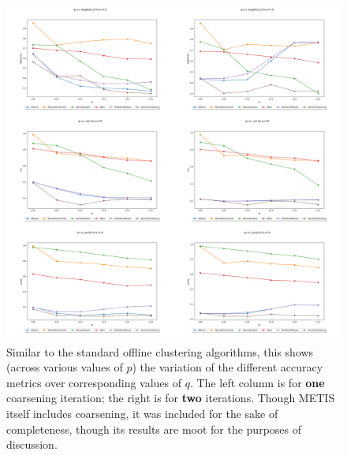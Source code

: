 \documentclass{article}
\begin{document}
\begin{figure}[H]
    \label{fig:results_coarsen}
    \centering
    \includegraphics[width=1.0\textwidth]{results/results_coarsen.png}
    \caption[Coarsened accuracies across $p$]{Similar to the standard offline clustering algorithms, this shows (across various values of $p$) the variation of the different accuracy metrics over corresponding values of $q$. The left column is for \textbf{one} coarsening iteration; the right is for \textbf{two} iterations. Though METIS itself includes coarsening, it was included for the sake of completeness, though its results are moot for the purposes of discussion.}
\end{figure}
\end{document}
